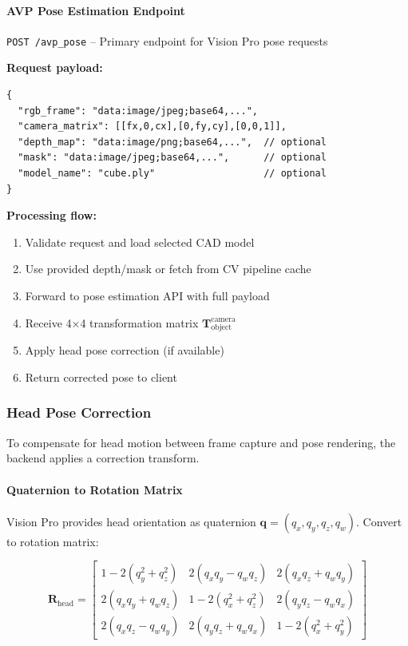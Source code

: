 \paragraph{AVP Pose Estimation Endpoint}

\texttt{POST /avp\_pose} -- Primary endpoint for Vision Pro pose requests

\textbf{Request payload:}
\begin{verbatim}
{
  "rgb_frame": "data:image/jpeg;base64,...",
  "camera_matrix": [[fx,0,cx],[0,fy,cy],[0,0,1]],
  "depth_map": "data:image/png;base64,...",  // optional
  "mask": "data:image/jpeg;base64,...",      // optional
  "model_name": "cube.ply"                   // optional
}
\end{verbatim}

\textbf{Processing flow:}
\begin{enumerate}
    \item Validate request and load selected CAD model
    \item Use provided depth/mask or fetch from CV pipeline cache
    \item Forward to pose estimation API with full payload
    \item Receive 4×4 transformation matrix $\mathbf{T}_{\text{object}}^{\text{camera}}$
    \item Apply head pose correction (if available)
    \item Return corrected pose to client
\end{enumerate}

\subsubsection{Head Pose Correction}

To compensate for head motion between frame capture and pose rendering, the backend applies a correction transform.

\paragraph{Quaternion to Rotation Matrix}

Vision Pro provides head orientation as quaternion $\mathbf{q} = (q_x, q_y, q_z, q_w)$. Convert to rotation matrix:

\[
\mathbf{R}_{\text{head}} = \begin{bmatrix}
1 - 2(q_y^2 + q_z^2) & 2(q_x q_y - q_w q_z) & 2(q_x q_z + q_w q_y) \\
2(q_x q_y + q_w q_z) & 1 - 2(q_x^2 + q_z^2) & 2(q_y q_z - q_w q_x) \\
2(q_x q_z - q_w q_y) & 2(q_y q_z + q_w q_x) & 1 - 2(q_x^2 + q_y^2)
\end{bmatrix}
\]

